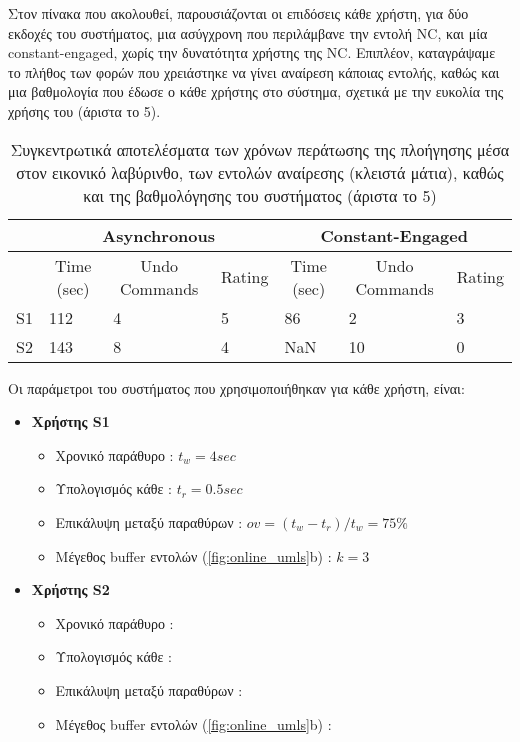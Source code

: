 \documentclass[11pt,a4paper,english,greek,twoside]{../Thesis}
\begin{document}
\par Στον πίνακα που ακολουθεί, παρουσιάζονται οι επιδόσεις κάθε χρήστη, για δύο εκδοχές του συστήματος, μια ασύγχρονη που περιλάμβανε την εντολή NC, και μία constant-engaged, χωρίς την δυνατότητα χρήστης της NC. Επιπλέον, καταγράψαμε το πλήθος των φορών που χρειάστηκε να γίνει αναίρεση κάποιας εντολής, καθώς και μια βαθμολογία που έδωσε ο κάθε χρήστης στο σύστημα, σχετικά με την ευκολία της χρήσης του (άριστα το 5).
\begin{table}[H]
    \centering
    \begin{tabular}{ |p{1cm}||p{1cm}|p{1cm}|p{1cm}|p{1cm}|p{1cm}|p{1cm}|}
        \hline
        & \multicolumn{3}{c|}{Asynchronous} & \multicolumn{3}{c|}{Constant-Engaged} \\
        \hline
        & \multicolumn{1}{c|}{Time (sec)} & \multicolumn{1}{c|}{Undo Commands} & \multicolumn{1}{c|}{Rating} & \multicolumn{1}{c|}{Time (sec)} & \multicolumn{1}{c|}{Undo Commands} &
        \multicolumn{1}{c|}{Rating} \\
        \hline
        S1          & 112& 4& 5& 86& 2& 3 \\
        S2          & 143& 8& 4& NaN& 10& 0 \\
        \hline
    \end{tabular}
    \caption{Συγκεντρωτικά αποτελέσματα των χρόνων περάτωσης της πλοήγησης μέσα στον εικονικό λαβύρινθο, των εντολών αναίρεσης (κλειστά μάτια), καθώς και της βαθμολόγησης του συστήματος (άριστα το 5)}
    \label{tab:online}
\end{table}
\par Οι παράμετροι του συστήματος που χρησιμοποιήθηκαν για κάθε χρήστη, είναι:
\begin{itemize}
    \item \textbf{Χρήστης S1}
    \begin{itemize}
        \item Χρονικό παράθυρο : $t_w=4sec$
        \item Υπολογισμός κάθε : $t_r=0.5sec$
        \item Επικάλυψη μεταξύ παραθύρων : $ov = (t_w-t_r)/t_w=75\%$
        \item Μέγεθος buffer εντολών (\ref{fig:online_umls}b) : $k=3$
    \end{itemize}
    \item \textbf{Χρήστης S2}
    \begin{itemize}
        \item Χρονικό παράθυρο : %
        \item Υπολογισμός κάθε : %
        \item Επικάλυψη μεταξύ παραθύρων : %
        \item Μέγεθος buffer εντολών (\ref{fig:online_umls}b) : %
    \end{itemize}
\end{itemize}
\end{document}
